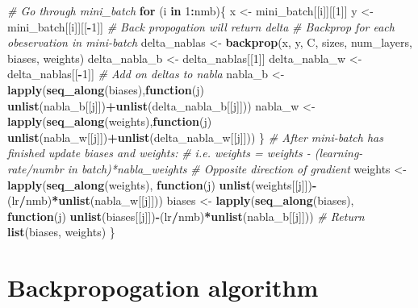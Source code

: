 \documentclass[]{book}
\newenvironment{Shaded}{\begin{snugshade}}{\end{snugshade}}
\newcommand{\CommentTok}[1]{\textcolor[rgb]{0.56,0.35,0.01}{\textit{#1}}}
\newcommand{\ControlFlowTok}[1]{\textcolor[rgb]{0.13,0.29,0.53}{\textbf{#1}}}
\newcommand{\DecValTok}[1]{\textcolor[rgb]{0.00,0.00,0.81}{#1}}
\newcommand{\KeywordTok}[1]{\textcolor[rgb]{0.13,0.29,0.53}{\textbf{#1}}}
\newcommand{\NormalTok}[1]{#1}
\newcommand{\OperatorTok}[1]{\textcolor[rgb]{0.81,0.36,0.00}{\textbf{#1}}}
\newcommand{\StringTok}[1]{\textcolor[rgb]{0.31,0.60,0.02}{#1}}
\begin{document}
\begin{Shaded}
\begin{Highlighting}[]
  \CommentTok{# Go through mini_batch}
  \ControlFlowTok{for}\NormalTok{ (i }\ControlFlowTok{in} \DecValTok{1}\OperatorTok{:}\NormalTok{nmb)\{}
\NormalTok{    x <-}\StringTok{ }\NormalTok{mini_batch[[i]][[}\DecValTok{1}\NormalTok{]]}
\NormalTok{    y <-}\StringTok{ }\NormalTok{mini_batch[[i]][[}\OperatorTok{-}\DecValTok{1}\NormalTok{]]}
    \CommentTok{# Back propogation will return delta}
    \CommentTok{# Backprop for each obeservation in mini-batch}
\NormalTok{    delta_nablas <-}\StringTok{ }\KeywordTok{backprop}\NormalTok{(x, y, C, sizes, num_layers, biases, weights)}
\NormalTok{    delta_nabla_b <-}\StringTok{ }\NormalTok{delta_nablas[[}\DecValTok{1}\NormalTok{]]}
\NormalTok{    delta_nabla_w <-}\StringTok{ }\NormalTok{delta_nablas[[}\OperatorTok{-}\DecValTok{1}\NormalTok{]]}
    \CommentTok{# Add on deltas to nabla}
\NormalTok{    nabla_b <-}\StringTok{ }\KeywordTok{lapply}\NormalTok{(}\KeywordTok{seq_along}\NormalTok{(biases),}\ControlFlowTok{function}\NormalTok{(j)}
      \KeywordTok{unlist}\NormalTok{(nabla_b[[j]])}\OperatorTok{+}\KeywordTok{unlist}\NormalTok{(delta_nabla_b[[j]]))}
\NormalTok{    nabla_w <-}\StringTok{ }\KeywordTok{lapply}\NormalTok{(}\KeywordTok{seq_along}\NormalTok{(weights),}\ControlFlowTok{function}\NormalTok{(j)}
      \KeywordTok{unlist}\NormalTok{(nabla_w[[j]])}\OperatorTok{+}\KeywordTok{unlist}\NormalTok{(delta_nabla_w[[j]]))}
\NormalTok{  \}}
  \CommentTok{# After mini-batch has finished update biases and weights:}
  \CommentTok{# i.e. weights = weights - (learning-rate/numbr in batch)*nabla_weights}
  \CommentTok{# Opposite direction of gradient}
\NormalTok{  weights <-}\StringTok{ }\KeywordTok{lapply}\NormalTok{(}\KeywordTok{seq_along}\NormalTok{(weights), }\ControlFlowTok{function}\NormalTok{(j)}
    \KeywordTok{unlist}\NormalTok{(weights[[j]])}\OperatorTok{-}\NormalTok{(lr}\OperatorTok{/}\NormalTok{nmb)}\OperatorTok{*}\KeywordTok{unlist}\NormalTok{(nabla_w[[j]]))}
\NormalTok{  biases <-}\StringTok{ }\KeywordTok{lapply}\NormalTok{(}\KeywordTok{seq_along}\NormalTok{(biases), }\ControlFlowTok{function}\NormalTok{(j)}
    \KeywordTok{unlist}\NormalTok{(biases[[j]])}\OperatorTok{-}\NormalTok{(lr}\OperatorTok{/}\NormalTok{nmb)}\OperatorTok{*}\KeywordTok{unlist}\NormalTok{(nabla_b[[j]]))}
  \CommentTok{# Return}
  \KeywordTok{list}\NormalTok{(biases, weights)}
\NormalTok{\}}
\end{Highlighting}
\end{Shaded}

\hypertarget{backpropogation-algorithm}{%
\section{Backpropogation algorithm}\label{backpropogation-algorithm}}
\end{document}
